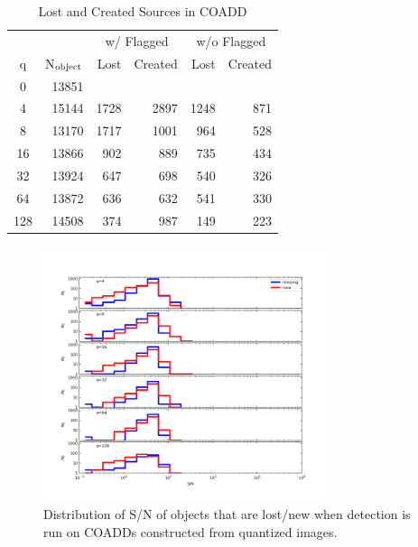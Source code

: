 \begin{table}
\caption{Lost and Created Sources in COADD}
\centering
\begin{tabular}[]{cr|rr|rr}
\hline
     &                  & \multicolumn{2}{c}{w/ Flagged}  & \multicolumn{2}{c}{w/o Flagged} \\
 q   & N$_{\rm object}$ & Lost & Created                  & Lost & Created  \\
\hline
   0 & 13851 &      &      &      &      \\
   4 & 15144 & 1728 & 2897 & 1248 &  871 \\
   8 & 13170 & 1717 & 1001 &  964 &  528 \\
  16 & 13866 &  902 &  889 &  735 &  434 \\
  32 & 13924 &  647 &  698 &  540 &  326 \\
  64 & 13872 &  636 &  632 &  541 &  330 \\
 128 & 14508 &  374 &  987 &  149 &  223 \\
\hline
\end{tabular}
\label{tab_coadd_lost_found}
\end{table}


\begin{figure}[t]
\centering
\includegraphics[width=0.75\textwidth]{figure/plot_coadd_missing_HSC-I.png}
\caption{Distribution of S/N of objects that are lost/new when detection is run on COADDs constructed from 
quantized images.}
\label{plot_coadd_lost_found}
\end{figure}





